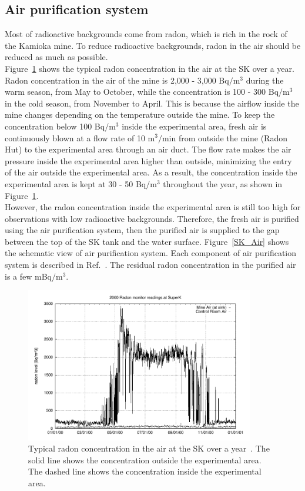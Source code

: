 \subsection{Air purification system}
\vs\hs Most of radioactive backgrounds come from radon, which is rich in the rock of the Kamioka mine.
To reduce radioactive backgrounds, radon in the air should be reduced as much as possible.\\
\hs Figure~\ref{SK_AirSeason} shows the typical radon concentration in the air at the SK over a year.
Radon concentration in the air of the mine is 2,000 - 3,000 Bq$/$m$^{\text{3}}$ during the warm season, from May to October, while the concentration is 100 - 300 Bq$/$m$^{\text{3}}$ in the cold season, from November to April.
This is because the airflow inside the mine changes depending on the temperature outside the mine.
To keep the concentration below 100 Bq$/$m$^{\text{3}}$ inside the experimental area, fresh air is continuously blown at a flow rate of 10 m$^{\text{3}}/$min from outside the mine (Radon Hut) to the experimental area through an air duct.
The flow rate makes the air pressure inside the experimental area higher than outside, minimizing the entry of the air outside the experimental area.
As a result, the concentration inside the experimental area is kept at 30 - 50 Bq$/$m$^{\text{3}}$ throughout the year, as shown in Figure~\ref{SK_AirSeason}.\\
\hs However, the radon concentration inside the experimental area is still too high for observations with low radioactive backgrounds.
Therefore, the fresh air is purified using the air purification system, then the purified air is supplied to the gap between the top of the SK tank and the water surface.
Figure~\ref{SK_Air} shows the schematic view of air purification system.
Each component of air purification system is described in Ref.~\cite{2015NakanoPhD}.
The residual radon concentration in the purified air is a few mBq$/$m$^{\text{3}}$.

\begin{figure}[h]
	\centering
	\includegraphics[width=10cm]{Figures/SK/AirSeason}
	\caption[Typical radon concentration in the air at the SK over a year]{\label{SK_AirSeason} Typical radon concentration in the air at the SK over a year~\cite{2003Fukuda}. The solid line shows the concentration outside the experimental area. The dashed line shows the concentration inside the experimental area.}
\end{figure}

